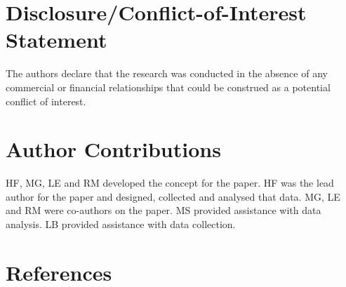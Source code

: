 \documentclass[
  english,
  man]{apa6}
\begin{document}
\hypertarget{disclosureconflict-of-interest-statement}{%
\section{Disclosure/Conflict-of-Interest Statement}\label{disclosureconflict-of-interest-statement}}

The authors declare that the research was conducted in the absence of any commercial or financial relationships that could be construed as a potential conflict of interest.

\hypertarget{author-contributions}{%
\section{Author Contributions}\label{author-contributions}}

HF, MG, LE and RM developed the concept for the paper.
HF was the lead author for the paper and designed, collected and analysed that data.
MG, LE and RM were co-authors on the paper.
MS provided assistance with data analysis.
LB provided assistance with data collection.

\hypertarget{references}{%
\section{References}\label{references}}

\begingroup
\setlength{\parindent}{-0.5in}
\setlength{\leftskip}{0.5in}
\end{document}
